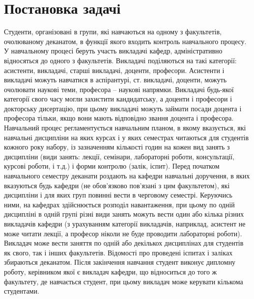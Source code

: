 \newpage
\chapter{Постановка задачі}
Студенти, організовані в групи, які навчаються на одному з 
факультетів, очолюваному деканатом, в функції якого входить 
контроль навчального процесу. У навчальному процесі беруть 
участь викладачі кафедр, адміністративно відносяться до одного 
з факультетів. Викладачі поділяються на такі категорії: асистенти, 
викладачі, старші викладачі, доценти, професори. Асистенти і 
викладачі можуть навчатися в аспірантурі, ст. викладачі, доценти, 
можуть очолювати наукові теми, професора -- наукові напрямки. 
Викладачі будь-якої категорії свого часу могли захистити 
кандидатську, а доценти і професори і докторську дисертацію, 
при цьому викладачі можуть займати посади доцента і професора 
тільки, якщо вони мають відповідно звання доцента і професора.
Навчальний процес регламентується навчальним планом, в якому 
вказується, які навчальні дисципліни на яких курсах і у яких 
семестрах читаються для студентів кожного року набору, із 
зазначенням кількості годин на кожен вид занять з дисципліни 
(види занять: лекції, семінари, лабораторні роботи, консультації, 
курсові роботи, і т.д.) і форми контролю (залік, іспит). 
Перед початком навчального семестру деканати роздають на кафедри 
навчальні доручення, в яких вказуються будь кафедри (не обов'язково
пов'язані з цим факультетом), які дисципліни і для яких груп
повинні вести в черговому семестрі. Керуючись ними, на кафедрах 
здійснюється розподіл навантаження, при цьому по одній дисципліні 
в одній групі різні види занять можуть вести один або кілька різних
викладачів кафедри (з урахуванням категорії викладачів, наприклад, 
асистент не може читати лекції, а професор ніколи не буде проводити
лабораторні роботи). Викладач може вести заняття по одній або декількох
дисциплінах для студентів як свого, так і інших факультетів. Відомості
про проведені іспитах і заліках збираються деканатом.
Після закінчення навчання студент виконує дипломну роботу, 
керівником якої є викладач кафедри, що відноситься до того 
ж факультету, де навчається студент, при цьому викладач може 
керувати кількома студентами. 

